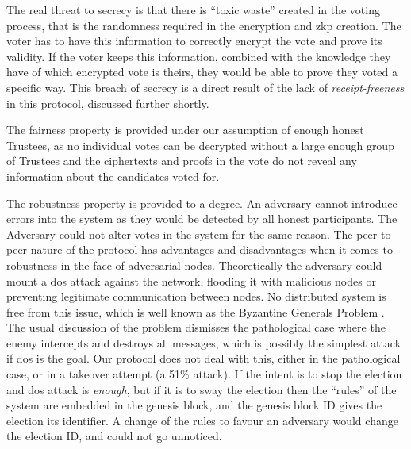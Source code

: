 The real threat to secrecy is that there is ``toxic waste'' created in the voting process, that is the randomness required in the encryption and \gls{zkp} creation. The voter has to have this information to correctly encrypt the vote and prove its validity. If the voter keeps this information, combined with the knowledge they have of which encrypted vote is theirs, they would be able to prove they voted a specific way. This breach of secrecy is a direct result of the lack of \emph{receipt-freeness} in this protocol, discussed further shortly.

The fairness property is provided under our assumption of enough honest Trustees, as no individual votes can be decrypted without a large enough group of Trustees and the ciphertexts and proofs in the vote do not reveal any information about the candidates voted for.

The robustness property is provided to a degree. An adversary cannot introduce errors into the system as they would be detected by all honest participants. The Adversary could not alter votes in the system for the same reason. The peer-to-peer nature of the protocol has advantages and disadvantages when it comes to robustness in the face of adversarial nodes. Theoretically the adversary could mount a \gls{dos} attack against the network, flooding it with malicious nodes or preventing legitimate communication between nodes. No distributed system is free from this issue, which is well known as the Byzantine Generals Problem \cite{lamportByzantineGeneralsProblem1982}. The usual discussion of the problem dismisses the pathological case where the enemy intercepts and destroys all messages, which is possibly the simplest attack if \gls{dos} is the goal. Our protocol does not deal with this, either in the pathological case, or in a takeover attempt (a 51\% attack). If the intent is to stop the election and \gls{dos} attack is \emph{enough}, but if it is to sway the election then the ``rules'' of the system are embedded in the genesis block, and the genesis block ID gives the election its identifier. A change of the rules to favour an adversary would change the election ID, and could not go unnoticed.

